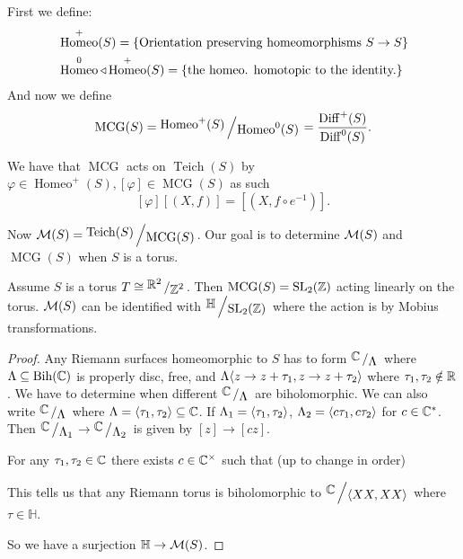 \documentclass[11pt,a4paper]{article}
\DeclareMathOperator{\Bih}{Bih}
\renewcommand{\H}{\mathbb H}
\DeclareMathOperator{\Homeo}{Homeo}
\DeclareMathOperator{\Diff}{Diff}
\DeclareMathOperator{\MCG}{MCG}
\DeclareMathOperator{\Teich}{Teich}
\begin{document}
\begin{definition}
  First we define:
  \begin{align*}
    &\Homeo^+(S) = \set{\text{Orientation preserving homeomorphisms
    $S \to S$}} \\
    &\Homeo^0 \triangleleft \Homeo^+(S) = \set{
      \text{the homeo. homotopic to the identity.}}
  \end{align*}
  And now we define
  \[
    \MCG(S) = \bigslant{\Homeo^+(S)}{\Homeo^0(S)} =
    \frac{\Diff^+(S)}{\Diff^0(S)}.
  \]
\end{definition}

We have that $\MCG$ acts on $\Teich(S)$ by $\varphi \in \Homeo^+(S),
[\varphi] \in \MCG(S)$
as such
\[
  [\varphi] [(X,f)] = [(X,f \circ e^{-1})].
\]

Now $\M(S) = \bigslant{\Teich(S)}{\MCG(S)}$.
Our goal is to determine $\mathcal{M}(S)$ and $\MCG(S)$ when $S$ is a torus.

\begin{theorem}
  Assume $S$ is a torus $T \cong \bigslant{\R^2}{\Z^2}$.
  Then $\MCG(S) = \SL_2(\Z)$ acting linearly on the torus.
  $\mathcal{M}(S)$ can be identified with $\bigslant{\H}{\SL_2(\Z)}$ where the
  action is by Mobius transformations.
\end{theorem}
\begin{proof}
  Any Riemann surfaces homeomorphic to $S$ has to form 
  $\bigslant{\C}{\Lambda}$ where $\Lambda \subseteq \Bih(\C)$ is
properly disc, free, and $\Lambda \langle z \to z + \tau_1, z \to z + \tau_2 \rangle$
  where $\tau_1,\tau_2 \notin \mathbb{R}$.
  We have to determine when different $\bigslant{\C}{\Lambda}$ are
  biholomorphic.
  We can also write $\bigslant{\C}{\Lambda}$ where 
  $\Lambda = \langle \tau_1, \tau_2 \rangle \subseteq \mathbb{C}$.
  If $\Lambda_1 = \langle \tau_1, \tau_2 \rangle$, $\Lambda_2 = \langle c \tau_1, c \tau_2 \rangle$
  for $c \in \mathbb{C}^*$.
  Then $\bigslant{\C}{\Lambda_1} \to \bigslant{\C}{\Lambda_2}$
  is given by $[z] \to [cz]$.

  For any $\tau_1, \tau_2 \in \mathbb{C}$ there exists $c \in \mathbb{C}^{\times}$
  such that (up to change in order)


  This tells us that any Riemann torus is biholomorphic to 
  $\bigslant{\C}{\ip{XX}{XX}}$ where $\tau \in \H$.

  So we have a surjection $\H \to \M(S)$.
\end{proof}
\end{document}
